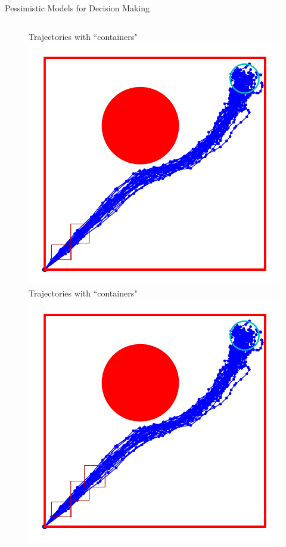 \documentclass[lecture]{beamer}
\begin{document}
\begin{frame}{\normalsize Pessimistic Models for Decision Making}
\begin{columns}[t]
\begin{overlayarea}{\textwidth}{1\textheight}
\begin{figure}
{        }%
        {%
                \center
        Trajectories with ``containers"
  \includegraphics[width=\FS\textwidth]{Codes/BasicsSafety/PessimisticModel2.pdf}%
        }%
        {%
                \center
        Trajectories with ``containers"
  \includegraphics[width=\FS\textwidth]{Codes/BasicsSafety/PessimisticModel3.pdf}%
}
\end{figure}
\end{overlayarea}
\end{columns}
\end{frame}
\end{document}
